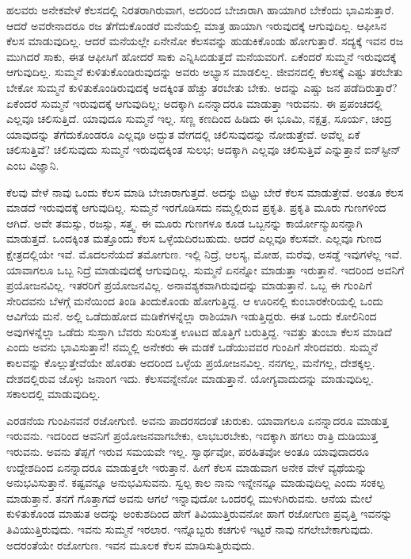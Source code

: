ಹಲವರು ಅನೇಕವೇಳೆ ಕೆಲಸದಲ್ಲಿ ನಿರತರಾಗಿರುವಾಗ, ಅದರಿಂದ ಬೇಜಾರಾಗಿ ಹಾಯಾಗಿರ ಬೇಕೆಂದು ಭಾವಿಸುತ್ತಾರೆ. ಆದರೆ ಅವರೇನಾದರೂ ರಜ ತೆಗೆದುಕೊಂಡರೆ ಮನೆಯಲ್ಲಿ ಮಾತ್ರ ಹಾಯಾಗಿ ಇರುವುದಕ್ಕೆ ಆಗುವುದಿಲ್ಲ. ಆಫೀಸಿನ ಕೆಲಸ ಮಾಡುವುದಿಲ್ಲ. ಆದರೆ ಮನೆಯಲ್ಲೇ ಏನೇನೋ ಕೆಲಸವನ್ನು ಹುಡುಕಿಕೊಂಡು ಹೋಗುತ್ತಾರೆ. ಸದ್ಯಕ್ಕೆ ಇವನ ರಜ ಮುಗಿದರೆ ಸಾಕು, ಈತ ಆಫೀಸಿಗೆ ಹೋದರೆ ಸಾಕು ಎನ್ನಿಸಿಬಿಡುತ್ತದೆ ಮನೆಯವರಿಗೆ. ಏಕೆಂದರೆ ಸುಮ್ಮನೆ ಇರುವುದಕ್ಕೆ ಆಗುವುದಿಲ್ಲ. ಸುಮ್ಮನೆ ಕುಳಿತುಕೊಂಡಿರುವುದನ್ನು ಅವರು ಅಭ್ಯಾಸ ಮಾಡಲಿಲ್ಲ. ಜೀವನದಲ್ಲಿ ಕೆಲಸಕ್ಕೆ ಎಷ್ಟು ತರಬೇತು ಬೇಕೋ ಸುಮ್ಮನೆ ಕುಳಿತುಕೊಂಡಿರುವುದಕ್ಕೆ ಅದಕ್ಕಿಂತ ಹೆಚ್ಚು ತರಬೇತು ಬೇಕು. ಅದನ್ನು ಎಷ್ಚು ಜನ ಪಡೆದಿರುತ್ತಾರೆ? ಏಕೆಂದರೆ ಸುಮ್ಮನೆ ಇರುವುದಕ್ಕೆ ಆಗುವುದಿಲ್ಲ; ಅದಕ್ಕಾಗಿ ಏನನ್ನಾದರೂ ಮಾಡುತ್ತಾ ಇರುವನು. ಈ ಪ್ರಪಂಚದಲ್ಲಿ ಎಲ್ಲವೂ ಚಲಿಸುತ್ತಿದೆ. ಯಾವುದೂ ಸುಮ್ಮನೆ ಇಲ್ಲ. ಸಣ್ಣ ಕಣದಿಂದ ಹಿಡಿದು ಈ ಭೂಮಿ, ನಕ್ಷತ್ರ, ಸೂರ್ಯ, ಚಂದ್ರ ಯಾವುದನ್ನು ತೆಗೆದುಕೊಂಡರೂ ಎಲ್ಲವೂ ಅದ್ಭುತ ವೇಗದಲ್ಲಿ ಚಲಿಸುವುದನ್ನು ನೋಡುತ್ತೇವೆ. ಅವೆಲ್ಲ ಏಕೆ ಚಲಿಸುತ್ತಿವೆ? ಚಲಿಸುವುದು ಸುಮ್ಮನೆ ಇರುವುದಕ್ಕಿಂತ ಸುಲಭ; ಅದಕ್ಕಾಗಿ ಎಲ್ಲವೂ ಚಲಿಸುತ್ತಿವೆ ಎನ್ನುತ್ತಾನೆ ಐನ್​ಸ್ಟೀನ್ ಎಂಬ ವಿಜ್ಞಾನಿ.

ಕೆಲವು ವೇಳೆ ನಾವು ಒಂದು ಕೆಲಸ ಮಾಡಿ ಬೇಜಾರಾಗುತ್ತದೆ. ಅದನ್ನು ಬಿಟ್ಟು ಬೇರೆ ಕೆಲಸ ಮಾಡುತ್ತೇವೆ. ಅಂತೂ ಕೆಲಸ ಮಾಡದೆ ಇರುವುದಕ್ಕೆ ಆಗುವುದಿಲ್ಲ. ಸುಮ್ಮನೆ ಇರಗೊಡಿಸದು ನಮ್ಮಲ್ಲಿರುವ ಪ್ರಕೃತಿ. ಪ್ರಕೃತಿ ಮೂರು ಗುಣಗಳಿಂದ ಆಗಿದೆ. ಅವೇ ತಮಸ್ಸು, ರಜಸ್ಸು, ಸತ್ತ್ವ. ಈ ಮೂರು ಗುಣಗಳೂ ಕೂಡ ಒಬ್ಬನನ್ನು ಕಾರ್ಯೋನ್ಮುಖನನ್ನಾಗಿ ಮಾಡುತ್ತದೆ. ಒಂದಕ್ಕಿಂತ ಮತ್ತೊಂದು ಕೆಲಸ ಒಳ್ಳೆಯದಿರಬಹುದು. ಆದರೆ ಎಲ್ಲವೂ ಕೆಲಸವೇ. ಎಲ್ಲವೂ ಗುಣದ ಕ್ಷೇತ್ರದಲ್ಲಿಯೇ ಇವೆ. ಮೊದಲನೆಯದೆ ತಮೋಗುಣ. ಇಲ್ಲಿ ನಿದ್ರೆ, ಆಲಸ್ಯ, ಮೋಹ, ಮರೆವು, ಅಸಡ್ಡೆ ಇವುಗಳೆಲ್ಲ ಇವೆ. ಯಾವಾಗಲೂ ಒಬ್ಬ ನಿದ್ರೆ ಮಾಡುವುದಕ್ಕೆ ಆಗುವುದಿಲ್ಲ. ಸುಮ್ಮನೆ ಏನನ್ನೋ ಮಾಡುತ್ತಾ ಇರುತ್ತಾನೆ. ಇದರಿಂದ ಅವನಿಗೆ ಪ್ರಯೋಜನವಿಲ್ಲ. ಇತರರಿಗೆ ಪ್ರಯೋಜನವಿಲ್ಲ. ಅನಾವಶ್ಯಕವಾಗಿರುವುದನ್ನು ಮಾಡುತ್ತಾನೆ. ಒಬ್ಬ ಈ ಗುಂಪಿಗೆ ಸೇರಿದವನು ಬೆಳಗ್ಗೆ ಮನೆಯಿಂದ ತಿಂಡಿ ತಿಂದುಕೊಂಡು ಹೋಗುತ್ತಿದ್ದ. ಆ ಊರಿನಲ್ಲಿ ಕುಂಬಾರಕೇರಿಯಲ್ಲಿ ಒಂದು ಆವಿಗೆಯ ಮನೆ. ಅಲ್ಲಿ ಒಡೆದುಹೋದ ಮಡಿಕೆಗಳನ್ನೆಲ್ಲಾ ರಾಶಿಯಾಗಿ ಇಡುತ್ತಿದ್ದರು. ಈತ ಒಂದು ಕೋಲಿನಿಂದ ಅವುಗಳನ್ನೆಲ್ಲಾ ಒಡೆದು ಸುಸ್ತಾಗಿ ಬೆವರು ಸುರಿಸುತ್ತ ಊಟದ ಹೊತ್ತಿಗೆ ಬರುತ್ತಿದ್ದ. ಇವತ್ತು ತುಂಬಾ ಕೆಲಸ ಮಾಡಿದೆ ಎಂದು ಅವನು ಭಾವಿಸುತ್ತಾನೆ! ನಮ್ಮಲ್ಲಿ ಅನೇಕರು ಈ ಮಡಕೆ ಒಡೆಯುವವರ ಗುಂಪಿಗೆ ಸೇರಿದವರು. ಸುಮ್ಮನೆ ಕಾಲವನ್ನು ಕೊಲ್ಲುತ್ತೇವೆಯೇ ಹೊರತು ಅದರಿಂದ ಒಳ್ಳೆಯ ಪ್ರಯೋಜನವಿಲ್ಲ. ನನಗಲ್ಲ, ಮನೆಗಲ್ಲ, ದೇಶಕ್ಕಲ್ಲ. ದೇಶದಲ್ಲಿರುವ ಜೊಳ್ಳು ಜನಾಂಗ ಇದು. ಕೆಲಸವನ್ನೇನೋ ಮಾಡುತ್ತಾನೆ. ಯೋಗ್ಯವಾದುದನ್ನು ಮಾಡುವುದಿಲ್ಲ. ಸಕಾಲದಲ್ಲಿ ಮಾಡುವುದಿಲ್ಲ.

ಎರಡನೆಯ ಗುಂಪಿನವನೆ ರಜೋಗುಣಿ. ಅವನು ಪಾದರಸದಂತೆ ಚುರುಕು. ಯಾವಾಗಲೂ ಏನನ್ನಾದರೂ ಮಾಡುತ್ತ ಇರುವನು. ಇದರಿಂದ ಅವನಿಗೆ ಪ್ರಯೋಜನವಾಗಬೇಕು, ಲಾಭ\break ಬರಬೇಕು, ಇದಕ್ಕಾಗಿ ಹಗಲು ರಾತ್ರಿ ದುಡಿಯುತ್ತ ಇರುವನು. ಅವನು ತೆಪ್ಪಗೆ ಇರುವ ಸಮಯವೇ ಇಲ್ಲ. ಸ್ವಾರ್ಥವೋ, ಪರಹಿತವೋ ಅಂತೂ ಯಾವುದಾದರೂ ಉದ್ದೇಶದಿಂದ ಏನನ್ನಾದರೂ ಮಾಡುತ್ತಲೇ ಇರುತ್ತಾನೆ. ಹೀಗೆ ಕೆಲಸ ಮಾಡುವಾಗ ಅನೇಕ ವೇಳೆ ವ್ಯಥೆಯನ್ನು ಅನುಭವಿಸುತ್ತಾನೆ. ಕಷ್ಟವನ್ನೂ ಅನುಭವಿಸುವನು. ಸ್ವಲ್ಪ ಕಾಲ ನಾನು ಇನ್ನೇನನ್ನೂ ಮಾಡುವುದಿಲ್ಲ ಎಂದು ಸಂಕಲ್ಪ ಮಾಡುತ್ತಾನೆ. ತನಗೆ ಗೊತ್ತಾಗದೆ ಅವನು ಆಗಲೆ ಇನ್ನಾವುದೋ ಒಂದರಲ್ಲಿ ಮುಳುಗಿರುವನು. ಆನೆಯ ಮೇಲೆ ಕುಳಿತುಕೊಂಡ ಮಾಹುತ ಅದನ್ನು ಅಂಕುಶದಿಂದ ಹೇಗೆ ತಿವಿಯುತ್ತಿರುವನೋ ಹಾಗೆ ರಜೋಗುಣ ಪ್ರವೃತ್ತಿ ಇವನನ್ನು ತಿವಿಯುತ್ತಿರುವುದು. ಇವನು ಸುಮ್ಮನೆ ಇರಲಾರ. ಇನ್ನೊಬ್ಬರು ಕಚಗುಳಿ ಇಟ್ಟರೆ ನಾವು ನಗಲೇಬೇಕಾಗುವುದು. ಅದರಂತೆಯೇ ರಜೋಗುಣ. ಇವನ ಮೂಲಕ ಕೆಲಸ ಮಾಡಿಸುತ್ತಿರುವುದು.

